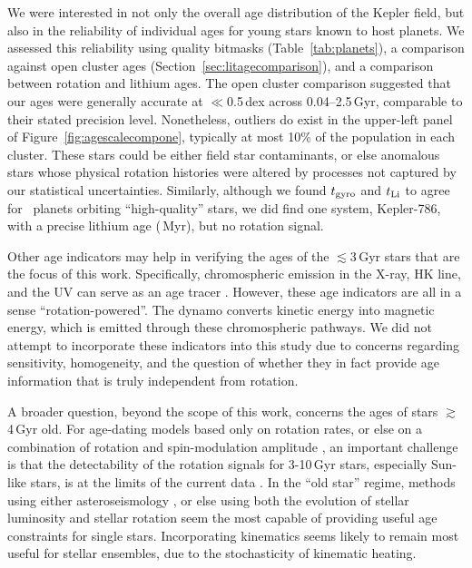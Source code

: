\documentclass[11pt,twocolumn,tighten]{aastex63}
\begin{document}
We were interested in not only the overall age
distribution of the Kepler field, but also in the reliability of
individual ages for young stars known to host planets.  
We assessed this reliability using
quality
bitmasks (Table~\ref{tab:planets}), 
a comparison against open cluster ages (Section~\ref{sec:litagecomparison}),
and a comparison between rotation and lithium ages.
The open cluster comparison suggested that our ages were generally
accurate at $\ll$0.5\,dex across 0.04--2.5\,Gyr, comparable to their
stated precision level.
Nonetheless,
outliers do exist in the upper-left panel of Figure~\ref{fig:agescalecompone},
typically at most 10\% of the population in each cluster.
These stars could be either field star contaminants, or else anomalous
stars whose physical rotation histories were altered by processes not
captured by our statistical uncertainties.
Similarly, although
we found $t_{\rm gyro}$ and $t_{\rm Li}$ to agree
for 
\ltonegyrhighqconfirmedtwosided\ planets orbiting ``high-quality''
stars, we did find
one system, Kepler-786, with a precise lithium age
(\kepseveneightsix\,Myr), but no rotation signal.

Other age indicators may help in verifying the ages of the
$\lesssim$3\,Gyr stars that are the focus of this work.  Specifically,
chromospheric emission in the X-ray,  HK line, and the UV
can serve as an age tracer
\citep{Mamajek_2008,2014MNRAS.441.2361V,2024ApJ...960...62E}.
However, these age indicators are all in a sense ``rotation-powered''.
The dynamo converts kinetic energy into magnetic energy, which is
emitted through these chromospheric pathways.  We did not attempt to
incorporate these indicators into this study due to concerns regarding
sensitivity, homogeneity, and the question of whether they in fact
provide age information that is truly independent from rotation.

A broader question, beyond the scope of this work, concerns the ages
of stars $\gtrsim$4\,Gyr old.  For
age-dating models based only on rotation rates, or else on a
combination of rotation and spin-modulation amplitude
\citep{2023ApJ...952..131M}, an important challenge is that the
detectability of the rotation signals for 3-10\,Gyr stars, especially
Sun-like stars, is at the limits of the current data
\citep{2022ApJ...937...94M}.  In the ``old star'' regime, methods
using either asteroseismology
\citep{vanSaders_2016,2024ApJ...962..138S}, or else using both the
evolution of stellar luminosity and stellar rotation
\citep{Angus_2019} seem the most capable of providing useful age
constraints for single stars.  Incorporating kinematics
\citep{2021AJ....161..189L} seems likely to remain most useful for
stellar ensembles, due to the stochasticity of kinematic heating.
\end{document}

